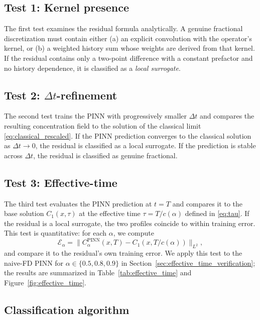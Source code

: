\documentclass[11pt]{article}
\begin{document}
\subsection{Test 1: Kernel presence}

The first test examines the residual formula analytically. A genuine fractional discretization must contain either (a) an explicit convolution with the operator's kernel, or (b) a weighted history sum whose weights are derived from that kernel. If the residual contains only a two-point difference with a constant prefactor and no history dependence, it is classified as a \emph{local surrogate}.

\subsection{Test 2: \(\Delta t\)-refinement}
\label{sec:dt_refinement}

The second test trains the PINN with progressively smaller \(\Delta t\) and compares the resulting concentration field to the solution of the classical limit \eqref{eq:classical_rescaled}. If the PINN prediction converges to the classical solution as \(\Delta t\to 0\), the residual is classified as a local surrogate. If the prediction is stable across \(\Delta t\), the residual is classified as genuine fractional.

\subsection{Test 3: Effective-time}
\label{sec:effective_time_test}

The third test evaluates the PINN prediction at \(t=T\) and compares it to the base solution \(C_1(x,\tau)\) at the effective time \(\tau = T/c(\alpha)\) defined in \eqref{eq:tau}. If the residual is a local surrogate, the two profiles coincide to within training error. This test is quantitative: for each \(\alpha\), we compute
\begin{equation}
\mathcal{E}_\alpha = \|C_\alpha^{\mathrm{PINN}}(x,T) - C_1(x, T/c(\alpha))\|_{L^2},
\end{equation}
and compare it to the residual's own training error. We apply this test to the naive-FD PINN for \(\alpha \in \{0.5, 0.8, 0.9\}\) in Section~\ref{sec:effective_time_verification}; the results are summarized in Table~\ref{tab:effective_time} and Figure~\ref{fig:effective_time}.

\subsection{Classification algorithm}
\end{document}
